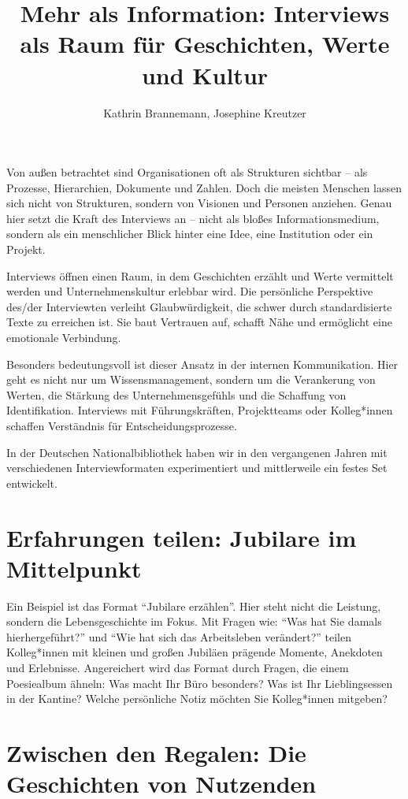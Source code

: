 \documentclass[a4paper,
fontsize=11pt,
oneside,
numbers=noperiodatend,
parskip=half-,
bibliography=totoc,
final
]{scrartcl}
\title{\LARGE{Mehr als Information: Interviews als Raum für Geschichten, Werte und Kultur}}%
\author{Kathrin Brannemann, Josephine Kreutzer} %
\date{}
\begin{document}
\maketitle
\thispagestyle{fancyplain} 


Von außen betrachtet sind Organisationen oft als Strukturen sichtbar --
als Prozesse, Hierarchien, Dokumente und Zahlen. Doch die meisten
Menschen lassen sich nicht von Strukturen, sondern von Visionen und
Personen anziehen. Genau hier setzt die Kraft des Interviews an -- nicht
als bloßes Informationsmedium, sondern als ein menschlicher Blick hinter
eine Idee, eine Institution oder ein Projekt.

Interviews öffnen einen Raum, in dem Geschichten erzählt und Werte
vermittelt werden und Unternehmenskultur erlebbar wird. Die persönliche
Perspektive des/der Interviewten verleiht Glaubwürdigkeit, die schwer
durch standardisierte Texte zu erreichen ist. Sie baut Vertrauen auf,
schafft Nähe und ermöglicht eine emotionale Verbindung.

Besonders bedeutungsvoll ist dieser Ansatz in der internen
Kommunikation. Hier geht es nicht nur um Wissensmanagement, sondern um
die Verankerung von Werten, die Stärkung des Unternehmensgefühls und die
Schaffung von Identifikation. Interviews mit Führungskräften,
Projektteams oder Kolleg*innen schaffen Verständnis für
Entscheidungsprozesse.

In der Deutschen Nationalbibliothek haben wir in den vergangenen Jahren
mit verschiedenen Interviewformaten experimentiert und mittlerweile ein
festes Set entwickelt.

\section{Erfahrungen teilen: Jubilare im
Mittelpunkt}\label{erfahrungen-teilen-jubilare-im-mittelpunkt}

Ein Beispiel ist das Format \enquote{Jubilare erzählen}. Hier steht
nicht die Leistung, sondern die Lebensgeschichte im Fokus. Mit Fragen
wie: \enquote{Was hat Sie damals hierhergeführt?} und \enquote{Wie hat
sich das Arbeitsleben verändert?} teilen Kolleg*innen mit kleinen und
großen Jubiläen prägende Momente, Anekdoten und Erlebnisse. Angereichert
wird das Format durch Fragen, die einem Poesiealbum ähneln: Was macht
Ihr Büro besonders? Was ist Ihr Lieblingsessen in der Kantine? Welche
persönliche Notiz möchten Sie Kolleg*innen mitgeben?

\section{Zwischen den Regalen: Die Geschichten von
Nutzenden}\label{zwischen-den-regalen-die-geschichten-von-nutzenden}
\end{document}

